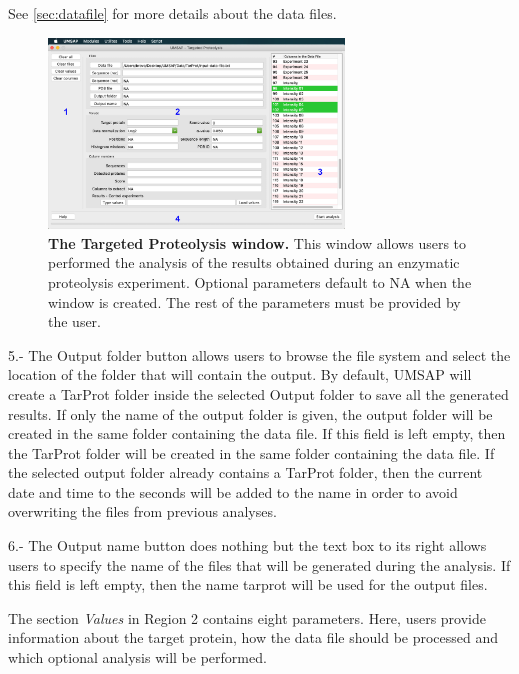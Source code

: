 See \autoref{sec:datafile} for more details about the data files.

\begin{figure}[h]
	\centering
	\includegraphics[width=0.7\textwidth]{./IMAGES/MOD-TARPROT/tarprot-mod.jpg}
	\caption[The Targeted Proteolysis window]{\textbf{The Targeted Proteolysis window.} This window allows users to performed the analysis of the results obtained during an enzymatic proteolysis experiment. Optional parameters default to NA when the window is created. The rest of the parameters must be provided by the user.} 
	\label{fig:enzdigmw}
	\vspace{-5pt} 	
\end{figure} 

\num{5}.- The Output folder\label{par:enzdigOutF} button allows users to browse the file system and select the location of the folder that will contain the output. By default, UMSAP will create a TarProt folder inside the selected Output folder to save all the generated results. If only the name of the output folder is given, the output folder will be created in the same folder containing the data file. If this field is left empty, then the TarProt folder will be created in the same folder containing the data file. If the selected output folder already contains a TarProt folder, then the current date and time to the seconds will be added to the name in order to avoid overwriting the files from previous analyses.

\num{6}.- The Output name button does nothing but the text box to its right allows users to specify the name of the files that will be generated during the analysis. If this field is left empty, then the name tarprot will be used for the output files. 

The section \textit{Values} in Region \num{2} contains eight parameters. Here, users provide information about the target protein, how the data file should be processed and which optional analysis will be performed.

